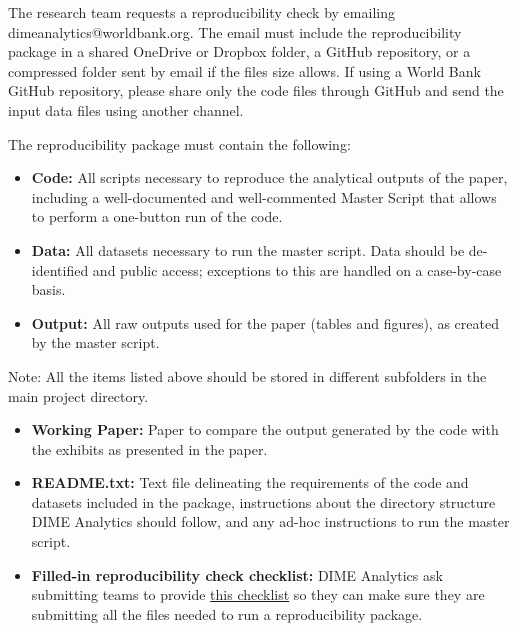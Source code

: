 \begin{fullwidth}
	The research team requests a reproducibility check by emailing dimeanalytics@worldbank.org. The email must include the reproducibility package in a shared OneDrive or Dropbox folder, a GitHub repository, or a compressed folder sent by email if the files size allows. If using a World Bank GitHub repository, please share only the code files through GitHub and send the input data files using another channel. 
	
	The reproducibility package must contain the following:

	\bigskip

	\begin{itemize}
		\setlength\itemsep{-0.1em}
		\item \textbf{Code:} All scripts necessary to reproduce the analytical outputs of the paper, including a well-documented and well-commented Master Script that allows to perform a one-button run of the code.
		\item \textbf{Data:} All datasets necessary to run the master script. Data should be de-identified and public access; exceptions to this are handled on a case-by-case basis.
		\item \textbf{Output:} All raw outputs used for the paper (tables and figures), as created by the master script.
	\end{itemize}

	\bigskip

	Note: All the items listed above should be stored in different subfolders in the main project directory.

	\bigskip

	\begin{itemize}
		\setlength\itemsep{-0.1em}
		\item \textbf{Working Paper:} Paper to compare the output generated by the code with the exhibits as presented in the paper.
		\item \textbf{README.txt:} Text file delineating the requirements of the code and datasets included in the package, instructions about the directory structure DIME Analytics should follow, and any ad-hoc instructions to run the master script.
		\item \textbf{Filled-in reproducibility check checklist:} DIME Analytics ask submitting teams to provide \href{https://raw.githubusercontent.com/worldbank/dime-standards/master/dime-research-standards/pillar-3-research-reproducibility/checklists/Reproducibility%20package%20submission%20checklist.pdf}{this checklist} so they can make sure they are submitting all the files needed to run a reproducibility package.
	\end{itemize}


\end{fullwidth}
